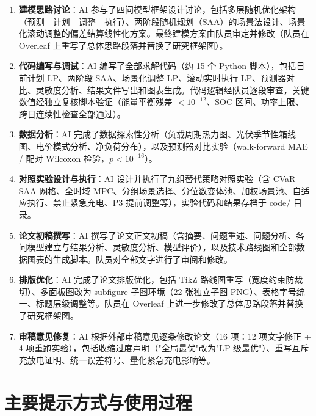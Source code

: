 \documentclass[zihao=-4,a4paper,UTF8,fontset=fandol]{ctexart}
\begin{document}
\begin{enumerate}
  \item \textbf{建模思路讨论}：AI 参与了四问模型框架设计讨论，包括多层随机优化架构（预测—计划—调整—执行）、两阶段随机规划（SAA）的场景法设计、场景化滚动调整的偏差结算线性化方案。最终建模方案由队员审定并修改（队员在 Overleaf 上重写了总体思路段落并替换了研究框架图）。

  \item \textbf{代码编写与调试}：AI 编写了全部求解代码（约 15 个 Python 脚本），包括日前计划 LP、两阶段 SAA、场景化调整 LP、滚动实时执行 LP、预测器对比、灵敏度分析、结果文件写出和图表生成。代码逻辑经队员逐段审查，关键数值经独立复核脚本验证（能量平衡残差 $<10^{-12}$、SOC 区间、功率上限、跨日连续性检查全部通过）。

  \item \textbf{数据分析}：AI 完成了数据探索性分析（负载周期热力图、光伏季节性箱线图、电价模式分析、净负荷分布），以及预测器对比实验（walk-forward MAE / 配对 Wilcoxon 检验，$p<10^{-16}$）。

  \item \textbf{对照实验设计与执行}：AI 设计并执行了九组替代策略对照实验（含 CVaR-SAA 网格、全时域 MPC、分组场景选择、分位数变体池、加权场景池、自适应执行、禁止紧急充电、P3 提前调整等），实验代码和结果存档于 code/ 目录。

  \item \textbf{论文初稿撰写}：AI 撰写了论文正文初稿（含摘要、问题重述、问题分析、各问模型建立与结果分析、灵敏度分析、模型评价），以及技术路线图和全部数据图表的生成脚本。队员对全部文字进行了审阅和修改。

  \item \textbf{排版优化}：AI 完成了论文排版优化，包括 TikZ 路线图重写（宽度约束防裁切）、多面板图改为 subfigure 子图环境（22 张独立子图 PNG）、表格字号统一、标题层级调整等。队员在 Overleaf 上进一步修改了总体思路段落并替换了研究框架图。

  \item \textbf{审稿意见修复}：AI 根据外部审稿意见逐条修改论文（16 项：12 项文字修正 + 4 项重跑实验），包括收缩过度声明（"全局最优"改为"LP 级最优"）、重写互斥充放电证明、统一误差符号、量化紧急充电影响等。
\end{enumerate}

\section{主要提示方式与使用过程}
\end{document}
